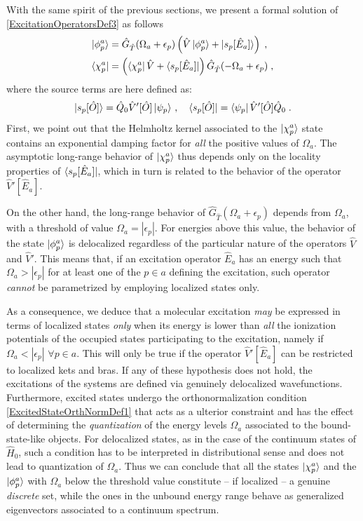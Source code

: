 \documentclass[reprint,aps,prb]{revtex4-1}
\newcommand{\eps}{\epsilon}
\newcommand{\be}{\begin{equation}}
\newcommand{\ee}{\end{equation}}
\newcommand{\nn}{\notag}
\newcommand{\op}[1]{\hat {#1}}
\newcommand{\hnot}{\op{H}_0}
\newcommand{\GH}{\op G_{\op T}}
\begin{document}
With the same spirit of the previous sections, we present a formal solution of \eqref{ExcitationOperatorsDef3} as follows
\begin{align}
\ket{\phi^a_p} &= \GH(\Omega_a+\eps_p)\left(\op V \ket{\phi^a_p} + \ket{s_p[\op E_a]} \right) \;, \nn \\
\bra {\chi^a_p} &=\left(\bra{\chi^a_p} \op V  + \bra{s_p[\op E_a]}\right)  \GH(-\Omega_a+\eps_p)\;,
\end{align}
where the source terms are here defined as:
\be
 \ket{s_p[\op O]} =  \op Q_0 \op V'[\op O] \ket{\psi_p}\,, \quad
 \bra{s_p[\op O]} =   \bra{\psi_p} \op V'[\op O] \op Q_0 \nn \;.
\ee
First, we point out that the Helmholtz kernel associated to the $\ket{\chi^a_p}$ state
contains an exponential damping factor for \emph{all} the positive values of $\Omega_a$.
The asymptotic long-range behavior of $\ket{\chi^a_p}$ thus depends only on the locality properties of
$\bra{s_p[\op E_a]}$, which in turn is related to the behavior of the operator $\op V'[\op E_a]$.

On the other hand, the long-range behavior of $\GH(\Omega_a+\eps_p)$ depends from
$\Omega_a$, with a threshold of value $\Omega_a=|\eps_p|$.
For energies above this value, the behavior of the state $\ket{\phi^a_p}$ is
delocalized regardless of the particular nature of the operators $\op V$ and $\op V'$.
This means that, if an excitation operator $\op E_a$ has an energy such that
$\Omega_a>|\eps_p|$  for at least one of the $p \in a$ defining the excitation,
such operator \emph{cannot} be parametrized by employing localized states only.

As a consequence, we deduce that a molecular excitation \emph{may} be expressed in terms of localized states
\emph{only} when its energy is lower than \emph{all} the ionization potentials of the occupied states participating to the excitation,
namely if $\Omega_a<|\eps_p|$ $\forall p \in a$. This will only be true if the operator
$\op V'[\op E_a]$ can be restricted to localized kets and bras.
If any of these hypothesis does not hold, the excitations of the systems are defined via genuinely delocalized wavefunctions.
Furthermore, excited states undergo the orthonormalization condition
\eqref{ExcitedStateOrthNormDef1} that acts as a ulterior constraint and has the effect of determining the \emph{quantization}
of the energy levels $\Omega_a$ associated to the bound-state-like objects.
For delocalized states, as in the case of the continuum states of $\hnot$,
such a condition has to be interpreted in distributional sense and does not lead to quantization of $\Omega_a$.
Thus we can conclude that all the states $\ket{\chi^a_p}$ and the $\ket{\phi^a_p}$ with $\Omega_a$ below the threshold value constitute
-- if localized -- a genuine \emph{discrete} set, while the ones in the unbound energy range behave as generalized eigenvectors associated to a
continuum spectrum.
\end{document}
